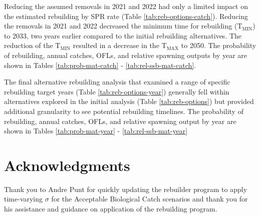\documentclass[11pt,
  english,
  a4paper,
]{article}
\begin{document}
\leavevmode\tagmcend\tagstructend\par


Reducing the assumed removals in 2021 and 2022 had only a limited impact on the estimated rebuilding by SPR rate (Table \ref{tab:reb-options-catch}). Reducing the removals in 2021 and 2022 decreased the minimum time for rebuilding ({\(\text{T}_\text{MIN}\)\leavevmode\tagmcend\tagstructend}) to 2033, two years earlier compared to the initial rebuilding alternatives. The reduction of the {\(\text{T}_\text{MIN}\)\leavevmode\tagmcend\tagstructend} resulted in a decrease in the {\(\text{T}_\text{MAX}\)\leavevmode\tagmcend\tagstructend} to 2050. The probability of rebuilding, annual catches, OFLs, and relative spawning outputs by year are shown in Tables \ref{tab:prob-mat-catch} - \ref{tab:rel-ssb-mat-catch}.

\leavevmode\tagmcend\tagstructend\par


The final alternative rebuilding analysis that examined a range of specific rebuilding target years (Table \ref{tab:reb-options-year}) generally fell within alternatives explored in the initial analysis (Table \ref{tab:reb-options}) but provided additional granularity to see potential rebuilding timelines. The probability of rebuilding, annual catches, OFLs, and relative spawning output by year are shown in Tables \ref{tab:prob-mat-year} - \ref{tab:rel-ssb-mat-year}

\leavevmode\tagmcend\tagstructend\par


\hypertarget{acknowledgments}{%
\section{Acknowledgments}\label{acknowledgments}}

\leavevmode\tagmcend\tagstructend


Thank you to Andre Punt for quickly updating the rebuilder program to apply time-varying {\(\sigma\)\leavevmode\tagmcend\tagstructend} for the Acceptable Biological Catch scenarios and thank you for his assistance and guidance on application of the rebuilding program.
\end{document}
